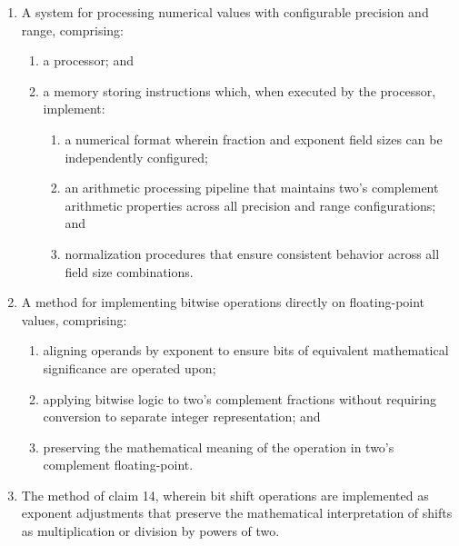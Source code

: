 \documentclass[12pt,letter]{article}
\begin{document}
\begin{enumerate}
    \item A system for processing numerical values with configurable precision and range, comprising:
        \begin{enumerate}
            \item a processor; and
            \item a memory storing instructions which, when executed by the processor, implement:
                \begin{enumerate}
                    \item a numerical format wherein fraction and exponent field sizes can be independently configured;
                    \item an arithmetic processing pipeline that maintains two's complement arithmetic properties across all precision and range configurations; and
                    \item normalization procedures that ensure consistent behavior across all field size combinations.
                \end{enumerate}
        \end{enumerate}
    
    \item A method for implementing bitwise operations directly on floating-point values, comprising:
        \begin{enumerate}
            \item aligning operands by exponent to ensure bits of equivalent mathematical significance are operated upon;
            \item applying bitwise logic to two's complement fractions without requiring conversion to separate integer representation; and
            \item preserving the mathematical meaning of the operation in two's complement floating-point.
        \end{enumerate}
    
    \item The method of claim 14, wherein bit shift operations are implemented as exponent adjustments that preserve the mathematical interpretation of shifts as multiplication or division by powers of two.
\end{enumerate}
\end{document}
